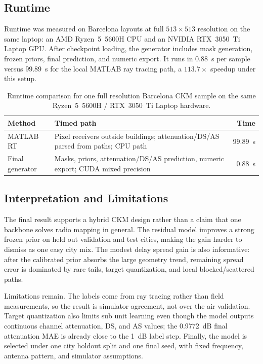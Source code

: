 \documentclass[journal]{IEEEtran}
\begin{document}
\subsection{Runtime}

Runtime was measured on Barcelona layouts at full \(513\times513\) resolution
on the same laptop: an AMD Ryzen~5~5600H CPU and an NVIDIA RTX~3050~Ti Laptop
GPU. After checkpoint loading, the generator includes mask generation, frozen
priors, final prediction, and numeric export. It runs in \SI{0.88}{s} per sample
versus \SI{99.89}{s} for the local MATLAB ray tracing path, a \(113.7\times\)
speedup under this setup.

\begin{table}[t]
\centering
\caption{Runtime comparison for one full resolution Barcelona CKM sample on
the same Ryzen~5~5600H / RTX~3050~Ti Laptop hardware.}
\label{tab:runtime}
\scriptsize
\begin{tabularx}{\linewidth}{lXr}
\toprule
Method & Timed path & Time \\
\midrule
MATLAB RT & Pixel receivers outside buildings; attenuation/DS/AS parsed from paths; CPU path &
\SI{99.89}{s} \\
Final generator & Masks, priors, attenuation/DS/AS prediction, numeric export; CUDA mixed precision &
\SI{0.88}{s} \\
\bottomrule
\end{tabularx}
\end{table}

\subsection{Interpretation and Limitations}

The final result supports a hybrid CKM design rather than a claim that one
backbone solves radio mapping in general. The residual model improves a strong
frozen prior on held out validation and test cities, making the gain harder to
dismiss as one easy city mix. The modest delay
spread gain is also informative: after the calibrated prior absorbs the large
geometry trend, remaining spread error is dominated by rare tails, target
quantization, and local blocked/scattered paths.

Limitations remain. The labels come from ray tracing rather than field
measurements, so the result is simulator agreement, not over the air validation.
Target quantization also limits sub unit learning even though the model outputs
continuous channel attenuation, DS, and AS values; the \SI{0.9772}{dB} final
attenuation MAE is already close to the \SI{1}{dB} label step. Finally, the
model is selected under one city holdout split and one final seed, with fixed
frequency, antenna pattern, and simulator assumptions.
\end{document}
